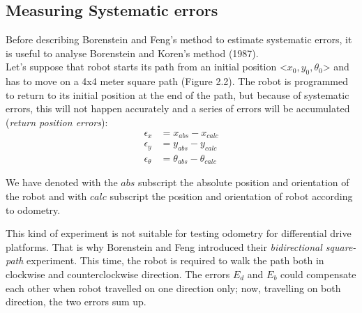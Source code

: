 \documentclass[a4paper, onecolumn]{report}
\begin{document}
\subsection{Measuring Systematic errors}
Before describing Borenstein and Feng's method to estimate systematic errors, it is useful to analyse Borenstein and Koren's method (1987). \\
Let's suppose that robot starts its path from an initial position <$x_0, y_0, \theta_0$> and has to move on a 4x4 meter square path (Figure 2.2). The robot is programmed to return to its initial position at the end of the path, but because of systematic errors, this will not happen accurately and a series of errors will be accumulated (\emph{return position errors}):
\begin{equation}
	\begin{aligned}
		\epsilon_{x} &= x_{abs}-x_{calc} \\
		\epsilon_{y} &= y_{abs}-y_{calc} \\
		\epsilon_{\theta} &= \theta_{abs}-\theta_{calc}
	\end{aligned}
\end{equation}

We have denoted with the $abs$ subscript the absolute position and orientation of the robot and with $calc$ subscript the position and orientation of robot according to odometry.

This kind of experiment is not suitable for testing odometry for differential drive platforms. That is why Borenstein and Feng introduced their \emph{bidirectional square-path} experiment. This time, the robot is required to walk the path both in clockwise and counterclockwise direction. The errors $E_d$ and $E_b$ could compensate each other when robot travelled on one direction only; now, travelling on both direction, the two errors sum up.
\end{document}
